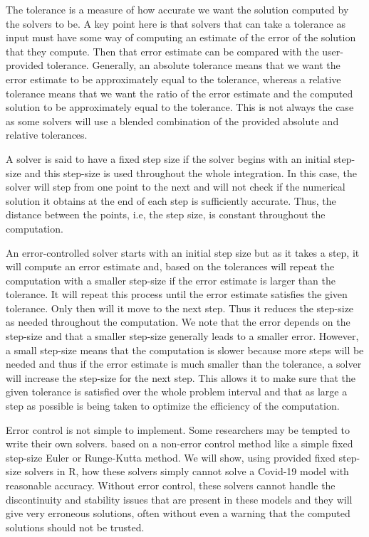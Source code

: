 The tolerance is a measure of how accurate we want the solution computed by the solvers to be. A key point here is that solvers that can take a tolerance as input must have some way of computing an estimate of the error of the solution that they compute. Then that error estimate can be compared with the user-provided tolerance. Generally, an absolute tolerance means that we want the error estimate to be approximately equal to the tolerance, whereas a relative tolerance means that we want the ratio of the error estimate and the computed solution to be approximately equal to the tolerance. This is not always the case as some solvers will use a blended combination of the provided absolute and relative tolerances.

A solver is said to have a fixed step size if the solver begins with an initial step-size and this step-size is used throughout the whole integration. In this case, the solver will step from one point to the next and will not check if the numerical solution it obtains at the end of each step is sufficiently accurate. Thus, the distance between the points, i.e, the step size, is constant throughout the computation.

An error-controlled solver starts with an initial step size but as it takes a step, it will compute an error estimate and, based on the tolerances will repeat the computation with a smaller step-size if the error estimate is larger than the tolerance. It will repeat this process until the error estimate satisfies the given tolerance. Only then will it move to the next step. Thus it reduces the step-size as needed throughout the computation. We note that the error depends on the step-size and that a smaller step-size generally leads to a smaller error. However, a small step-size means that the computation is slower because more steps will be needed and thus if the error estimate is much smaller than the tolerance, a solver will increase the step-size for the next step. This allows it to make sure that the given tolerance is satisfied over the whole problem interval and that as large a step as possible is being taken to optimize the efficiency of the computation.

Error control is not simple to implement. Some researchers may be tempted to write their own solvers. based on a non-error control method like a simple fixed step-size Euler or Runge-Kutta method. We will show, using provided fixed step-size solvers in R, how these solvers simply cannot solve a Covid-19 model with reasonable accuracy. Without error control, these solvers cannot handle the discontinuity and stability issues that are present in these models and they will give very erroneous solutions, often without even a warning that the computed solutions should not be trusted.

